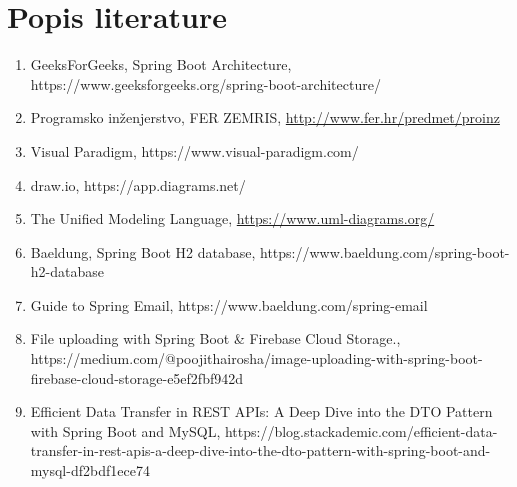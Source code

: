 \chapter*{Popis literature}
		
		\begin{enumerate}
			
			\item GeeksForGeeks, Spring Boot Architecture, https://www.geeksforgeeks.org/spring-boot-architecture/
			
			\item  Programsko inženjerstvo, FER ZEMRIS, \url{http://www.fer.hr/predmet/proinz}
			
			\item Visual Paradigm, https://www.visual-paradigm.com/
			
			\item draw.io, https://app.diagrams.net/
			
			\item  The Unified Modeling Language, \url{https://www.uml-diagrams.org/}
			
			\item Baeldung, Spring Boot H2 database, https://www.baeldung.com/spring-boot-h2-database
			
			\item Guide to Spring Email, https://www.baeldung.com/spring-email
			
			\item File uploading with Spring Boot \& Firebase Cloud Storage., https://medium.com/@poojithairosha/image-uploading-with-spring-boot-firebase-cloud-storage-e5ef2fbf942d
			
			\item Efficient Data Transfer in REST APIs: A Deep Dive into the DTO Pattern with Spring Boot and MySQL, https://blog.stackademic.com/efficient-data-transfer-in-rest-apis-a-deep-dive-into-the-dto-pattern-with-spring-boot-and-mysql-df2bdf1ece74
			
			
		\end{enumerate}
		
		 